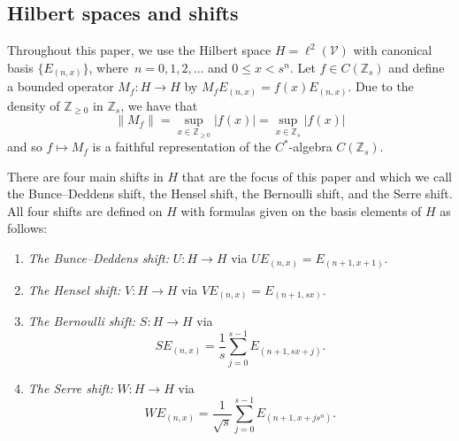 \documentclass[pdftex]{sigma}
\newcommand{\Z}{{\mathbb Z}}
\numberwithin{equation}{section}
\begin{document}
\subsection{Hilbert spaces and shifts}

Throughout this paper, we use the Hilbert space $H=\ell^2(\mathcal{V})$ with canonical basis $\{E_{(n,x)}\}$, where~${n=0,1,2,\dots}$ and $0\le x<s^n$. Let $f\in C(\Z_s)$ and define a bounded operator $M_f\colon H\to H$ by
$M_fE_{(n,x)}=f(x)E_{(n,x)}$.
Due to the density of $\Z_{\ge0}$ in $\Z_s$, we have that
\begin{equation*}
\|M_f\| = \sup_{x\in\Z_{\ge0}}{|f(x)|} = \sup_{x\in\Z_s}{|f(x)|}
\end{equation*}
and so $f\mapsto M_f$ is a faithful representation of the $C^*$-algebra $C(\Z_s)$.

There are four main shifts in $H$ that are the focus of this paper and which we call the Bunce--Deddens shift, the Hensel shift, the Bernoulli shift, and the Serre shift. All four shifts are defined on $H$ with formulas given on the basis elements of $H$ as follows:
\begin{enumerate}\itemsep=0pt
\item[(1)] \textit{The Bunce--Deddens shift:} $U\colon H\to H$ via
$
UE_{(n,x)}= E_{(n+1, x+1)}$.
\item[(2)] \textit{The Hensel shift:} $V\colon H\to H$ via
$
VE_{(n,x)} = E_{(n+1, sx)}$.
\item[(3)] \textit{The Bernoulli shift:} $S\colon H\to H$ via
\begin{equation*}
SE_{(n,x)}=\frac{1}{s}\sum_{j=0}^{s-1}E_{(n+1, sx+j)} .
\end{equation*}
\item[(4)] \textit{The Serre shift:} $W\colon H\to H$ via
\begin{equation*}
WE_{(n,x)} = \frac{1}{\sqrt{s}}\sum_{j=0}^{s-1}E_{(n+1, x+js^n)} .
\end{equation*}
\end{enumerate}
\end{document}
